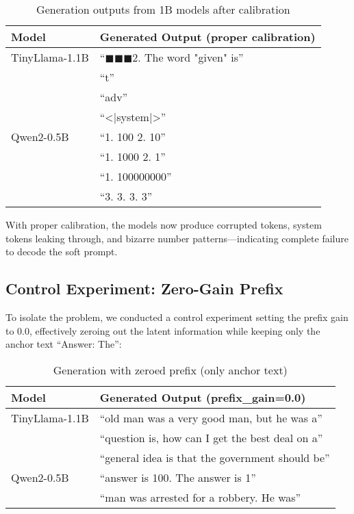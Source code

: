 \documentclass{article}
\begin{document}
\begin{table}[h]
\caption{Generation outputs from 1B models after calibration}
\label{tab:degenerate_after}
\vskip 0.15in
\begin{center}
\begin{small}
\begin{tabular}{ll}
\toprule
Model & Generated Output (proper calibration) \\
\midrule
TinyLlama-1.1B & ``$\blacksquare\blacksquare\blacksquare$2. The word "given" is'' \\
 & ``t'' \\
 & ``adv'' \\
 & ``<|system|>'' \\
Qwen2-0.5B & ``1. 100 2. 10'' \\
 & ``1. 1000 2. 1'' \\
 & ``1. 100000000'' \\
 & ``3. 3. 3. 3'' \\
\bottomrule
\end{tabular}
\end{small}
\end{center}
\vskip -0.1in
\end{table}

With proper calibration, the models now produce corrupted tokens, system tokens leaking through, and bizarre number patterns—indicating complete failure to decode the soft prompt.

\subsection{Control Experiment: Zero-Gain Prefix}

To isolate the problem, we conducted a control experiment setting the prefix gain to 0.0, effectively zeroing out the latent information while keeping only the anchor text ``Answer: The'':

\begin{table}[h]
\caption{Generation with zeroed prefix (only anchor text)}
\label{tab:zero_prefix}
\vskip 0.15in
\begin{center}
\begin{small}
\begin{tabular}{ll}
\toprule
Model & Generated Output (prefix\_gain=0.0) \\
\midrule
TinyLlama-1.1B & ``old man was a very good man, but he was a'' \\
 & ``question is, how can I get the best deal on a'' \\
 & ``general idea is that the government should be'' \\
Qwen2-0.5B & ``answer is 100. The answer is 1'' \\
 & ``man was arrested for a robbery. He was'' \\
\bottomrule
\end{tabular}
\end{small}
\end{center}
\vskip -0.1in
\end{table}
\end{document}
